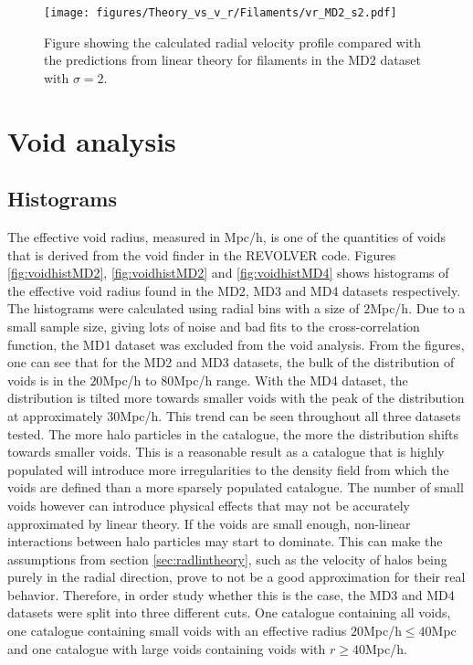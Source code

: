 \begin{figure}[H]
    \texttt{[image: figures/Theory\_vs\_v\_r/Filaments/vr\_MD2\_s2.pdf]}
    \caption{Figure showing the calculated radial velocity profile compared with the predictions from linear theory for filaments in the MD2 dataset with $\sigma=2$.}
    \label{fig:filvrMD2s2}
\end{figure}
\section{Void analysis}\label{sec:void}
\subsection{Histograms}
The effective void radius, measured in Mpc/h, is one of the quantities of voids that is derived from the void finder in the REVOLVER code. Figures \ref{fig:voidhistMD2}, \ref{fig:voidhistMD2} and \ref{fig:voidhistMD4} shows histograms of the effective void radius found in the MD2, MD3 and MD4 datasets respectively. The histograms were calculated using radial bins with a size of $2$Mpc/h. Due to a small sample size, giving lots of noise and bad fits to the cross-correlation function, the MD1 dataset was excluded from the void analysis. From the figures, one can see that for the MD2 and MD3 datasets, the bulk of the distribution of voids is in the $20$Mpc/h to $80$Mpc/h range. With the MD4 dataset, the distribution is tilted more towards smaller voids with the peak of the distribution at approximately $30$Mpc/h. This trend can be seen throughout all three datasets tested. The more halo particles in the catalogue, the more the distribution shifts towards smaller voids. This is a reasonable result as a catalogue that is highly populated will introduce more irregularities to the density field from which the voids are defined than a more sparsely populated catalogue. The number of small voids however can introduce physical effects that may not be accurately approximated by linear theory. If the voids are small enough, non-linear interactions between halo particles may start to dominate. This can make the assumptions from section \ref{sec:radlintheory}, such as the velocity of halos being purely in the radial direction, prove to not be a good approximation for their real behavior. Therefore, in order study whether this is the case, the MD3 and MD4 datasets were split into three different cuts. One catalogue containing all voids, one catalogue containing small voids with an effective radius $20$Mpc/h$\leq 40$Mpc and one catalogue with large voids containing voids with $r\geq 40$Mpc/h. 

